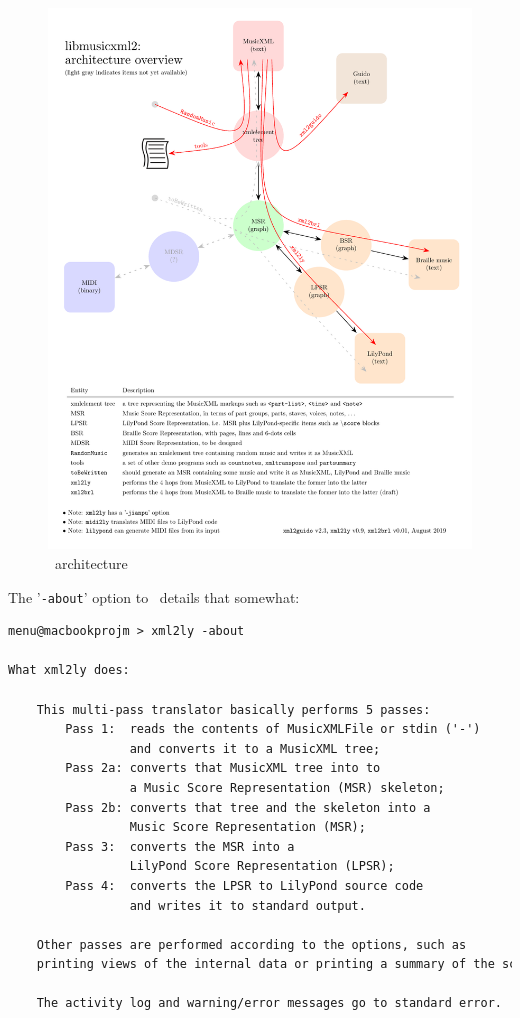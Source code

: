 \documentclass[12pt,a4paper]{article}
\begin{document}
\begin{figure}
\caption{\lib\ architecture}\label{libmusicxmlArchitecture}
\includegraphics[scale=0.8]{../libmusicxmlArchitecture/libmusicxmlArchitecture.pdf}
\end{figure}

The '{\tt -about}' option to \xmlToLy\ details that somewhat:
\begin{lstlisting}[language=XML]
menu@macbookprojm > xml2ly -about

What xml2ly does:

    This multi-pass translator basically performs 5 passes:
        Pass 1:  reads the contents of MusicXMLFile or stdin ('-')
                 and converts it to a MusicXML tree;
        Pass 2a: converts that MusicXML tree into to
                 a Music Score Representation (MSR) skeleton;
        Pass 2b: converts that tree and the skeleton into a
                 Music Score Representation (MSR);
        Pass 3:  converts the MSR into a
                 LilyPond Score Representation (LPSR);
        Pass 4:  converts the LPSR to LilyPond source code
                 and writes it to standard output.

    Other passes are performed according to the options, such as
    printing views of the internal data or printing a summary of the score.

    The activity log and warning/error messages go to standard error.
\end{lstlisting}
\end{document}

